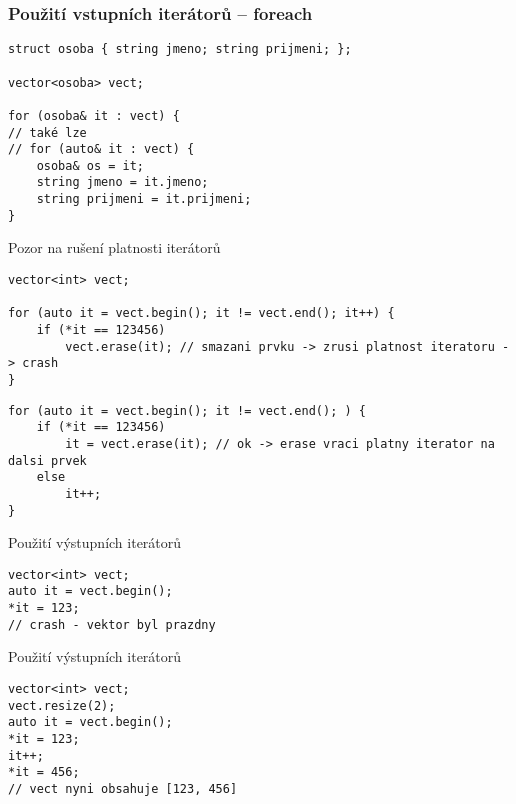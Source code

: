 \begin{frame}[fragile]
\frametitle{Použití vstupních iterátorů -- foreach}
\begin{yesblock}
\begin{lstlisting}
struct osoba { string jmeno; string prijmeni; };

vector<osoba> vect;

for (osoba& it : vect) {
// také lze
// for (auto& it : vect) {
	osoba& os = it;
	string jmeno = it.jmeno;
	string prijmeni = it.prijmeni;
}
\end{lstlisting}
\end{yesblock}
\end{frame}


\begin{frame}[fragile]
\begin{alertblock}{{\NO} Pozor na rušení platnosti iterátorů}
\begin{lstlisting}
vector<int> vect;

for (auto it = vect.begin(); it != vect.end(); it++) {
	if (*it == 123456) 
		vect.erase(it); // smazani prvku -> zrusi platnost iteratoru -> crash
}		
\end{lstlisting}
\end{alertblock}

\begin{yesblock}
\begin{lstlisting}
for (auto it = vect.begin(); it != vect.end(); ) {
	if (*it == 123456) 
		it = vect.erase(it); // ok -> erase vraci platny iterator na dalsi prvek
	else
		it++;
}		
\end{lstlisting}
\end{yesblock}	
\end{frame}




\begin{frame}[fragile]
\begin{alertblock}{{\NO} Použití výstupních iterátorů}
\begin{lstlisting}
vector<int> vect;
auto it = vect.begin();
*it = 123;
// crash - vektor byl prazdny
\end{lstlisting}
\end{alertblock}

\begin{exampleblock}{{\YES} Použití výstupních iterátorů}
\begin{lstlisting}
vector<int> vect;
vect.resize(2);
auto it = vect.begin();
*it = 123;
it++;
*it = 456;
// vect nyni obsahuje [123, 456]
\end{lstlisting}
\end{exampleblock}	
\end{frame}




